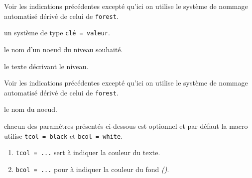 \documentclass[12pt,a4paper]{article}
\begin{document}


\extraspace
\extraspace

Voir les indications précédentes excepté qu'ici on utilise le système de nommage automatisé dérivé de celui de \verb#forest#.




\separation




\IDoption{} un système de type \texttt{clé = valeur}.


 le nom d'un noeud du niveau souhaité.

 le texte décrivant le niveau.


\bigskip




\extraspace
\extraspace

Voir les indications précédentes excepté qu'ici on utilise le système de nommage automatisé dérivé de celui de \verb#forest#.





\separation



 le nom du noeud.

 chacun des paramètres présentés ci-dessous est optionnel et par défaut la macro utilise \verb#tcol = black# et \verb#bcol = white#.

\begin{enumerate}
	\item \verb#tcol = ...# sert à indiquer la couleur du texte.

	\item \verb#bcol = ...# pour à indiquer la couleur du fond \emph{()}.
\end{enumerate}
\end{document}
